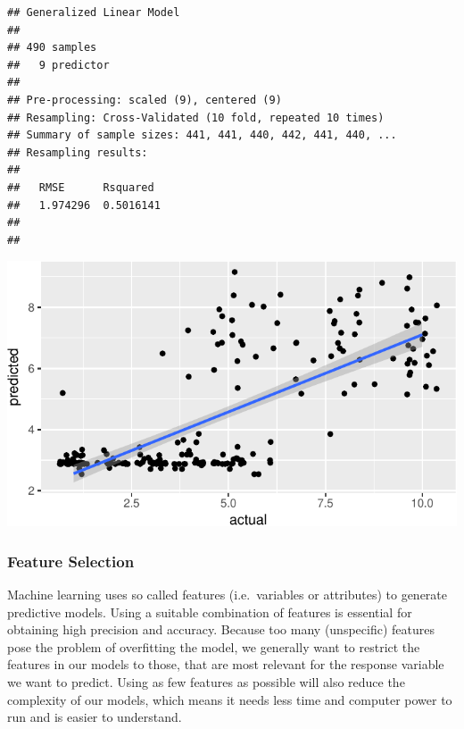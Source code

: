 \documentclass[]{article}
\newenvironment{Shaded}{\begin{snugshade}}{\end{snugshade}}
\newcommand{\KeywordTok}[1]{\textcolor[rgb]{0.13,0.29,0.53}{\textbf{{#1}}}}
\newcommand{\DataTypeTok}[1]{\textcolor[rgb]{0.13,0.29,0.53}{{#1}}}
\newcommand{\StringTok}[1]{\textcolor[rgb]{0.31,0.60,0.02}{{#1}}}
\newcommand{\NormalTok}[1]{{#1}}
\begin{document}
\begin{verbatim}
## Generalized Linear Model 
## 
## 490 samples
##   9 predictor
## 
## Pre-processing: scaled (9), centered (9) 
## Resampling: Cross-Validated (10 fold, repeated 10 times) 
## Summary of sample sizes: 441, 441, 440, 442, 441, 440, ... 
## Resampling results:
## 
##   RMSE      Rsquared 
##   1.974296  0.5016141
## 
## 
\end{verbatim}

\begin{Shaded}
\end{Shaded}

\includegraphics{webinar_code_files/figure-latex/regression_result-1.pdf}

\subsubsection{Feature Selection}\label{feature-selection}

Machine learning uses so called features (i.e.~variables or attributes)
to generate predictive models. Using a suitable combination of features
is essential for obtaining high precision and accuracy. Because too many
(unspecific) features pose the problem of overfitting the model, we
generally want to restrict the features in our models to those, that are
most relevant for the response variable we want to predict. Using as few
features as possible will also reduce the complexity of our models,
which means it needs less time and computer power to run and is easier
to understand.
\end{document}
